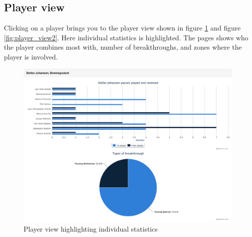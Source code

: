 \subsection{Player view}

Clicking on a player brings you to the player view shown in figure \ref{fig:player_view1} and figure \ref{fig:player_view2}. Here individual statistics is highlighted. The pages shows who the player combines most with, number of breakthroughs, and zones where the player is involved.

\begin{figure}[H]
\centering
\includegraphics[width=1\textwidth]{images/general/player_view1.png}
\caption{Player view highlighting individual statistics}
\label{fig:player_view1}
\end{figure}

